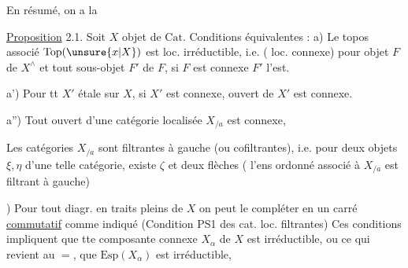 
En résumé, on a la

\uline{Proposition} 2.1. Soit $X$  objet de $\mathrm{Cat}$. Conditions équivalentes :
a) Le topos associé $\mathrm{Top}(\unsure{x|X})$ est loc. irréductible, i.e.  ( loc. connexe) pour  objet  $F$ de  $X^\wedge$ et tout sous-objet $F'$ de $F$, si $F$ est connexe $F'$ l'est.

a') Pour tt $X'$ étale sur $X$, si $X'$ est connexe,  ouvert de $X'$ est connexe.

a'') Tout ouvert d'une catégorie localisée $X_{/a}$  est connexe, 


 Les catégories $X_{/a}$ sont  filtrantes  à gauche (ou  cofiltrantes), i.e. pour deux objets $\xi,\eta$ d'une telle catégorie, existe  $\zeta$ et deux flèches
\diagram{\begin{tikzcd}[ampersand replacement=\&,row sep=0pt,column sep=small]
 \& \xi\\ \zeta\arrow[ur]\arrow[dr] \& {}\\ \& \eta
\end{tikzcd}}
( l'ens ordonné  associé à $X_{/a}$ est filtrant à gauche)

) Pour  tout diagr. en traits pleins de $X$
on peut le compléter en un carré \uline{commutatif} comme indiqué (Condition PS1 des cat. loc. filtrantes)
Ces conditions impliquent que tte composante connexe $X_\alpha$ de $X$ est irréductible, ou ce qui revient au $=$, que $\mathrm{Esp}(X_\alpha)$ est irréductible,
